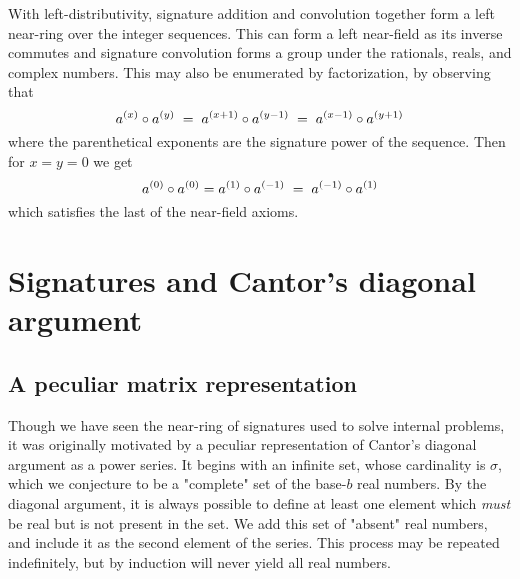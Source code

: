 \documentclass{article}
\begin{document}
\noindent With left-distributivity, signature addition and convolution together form a left near-ring over the integer sequences. This can form a left near-field as its inverse commutes and signature convolution forms a group under the rationals, reals, and complex numbers. This may also be enumerated by factorization, by observing that \begin{equation}a^{(x)} \circ a^{(y)} \hspace{1mm} = \hspace{1mm} a^{(x+1)} \circ a^{(y-1)} \hspace{1mm} = \hspace{1mm} a^{(x-1)} \circ a^{(y+1)}\end{equation} where the parenthetical exponents are the signature power of the sequence. Then for $x = y = 0$ we get \begin{equation} a^{(0)} \circ a^{(0)} = a^{(1)} \circ a^{(-1)} \hspace{1mm} = \hspace{1mm} a^{(-1)} \circ a^{(1)}\end{equation} which satisfies the last of the near-field axioms.

\iffalse
\subsection{Aerated signature convolution}

\noindent We can combine the process of signature convolution with signature aeration for the following identity:

\begin{equation} \sum_{k=0}^{n} d_{k}^{n-ak} \cdot F_g(n-ak) = F_{{\displaystyle \sum_{k=0}^{\infty} A_{d^{k+1}}^a} x^k g_k}(n) \end{equation}
\fi

\section{Signatures and Cantor's diagonal argument}

\subsection{A peculiar matrix representation}

Though we have seen the near-ring of signatures used to solve internal problems, it was originally motivated by a peculiar representation of Cantor's diagonal argument as a power series. It begins with an infinite set, whose cardinality is $\sigma$, which we conjecture to be a "complete" set of the base-$b$ real numbers. By the diagonal argument, it is always possible to define at least one element which \textit{must} be real but is not present in the set. We add this set of "absent" real numbers, and include it as the second element of the series. This process may be repeated indefinitely, but by induction will never yield all real numbers.\\
\end{document}
